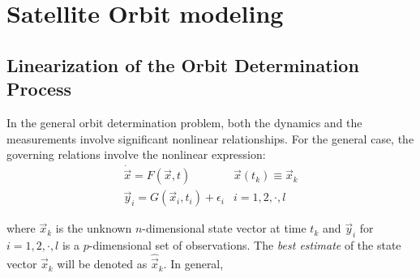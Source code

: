 \chapter{Satellite Orbit modeling}
\label{ch:satellite-orbit-modeling}

\section{Linearization of the Orbit Determination Process}
In the general orbit determination problem, both the dynamics and the measurements 
involve significant nonlinear relationships. For the general case, the governing 
relations involve the nonlinear expression:
\begin{align*}
  \dot{\vec{x}} = F( \vec{x}, t )                 & \vec{x}(t_k ) \equiv \vec{x}_k \\
  \vec{y}_i = G( \vec{x}_i , t_i ) + {\epsilon}_i & i=1,2,\cdot ,l
\end{align*}

where \(\vec{x}_k\) is the unknown \(n\)-dimensional state vector at time \(t_k\) and 
\(\vec{y}_i\) for \(i=1,2,\cdot ,l\) is a \(p\)-dimensional set of observations. The 
\emph{best estimate} of the state vector \(\vec{x}_k\) will be denoted as \(\hat{\vec{x}}_k\). 
In general, 
